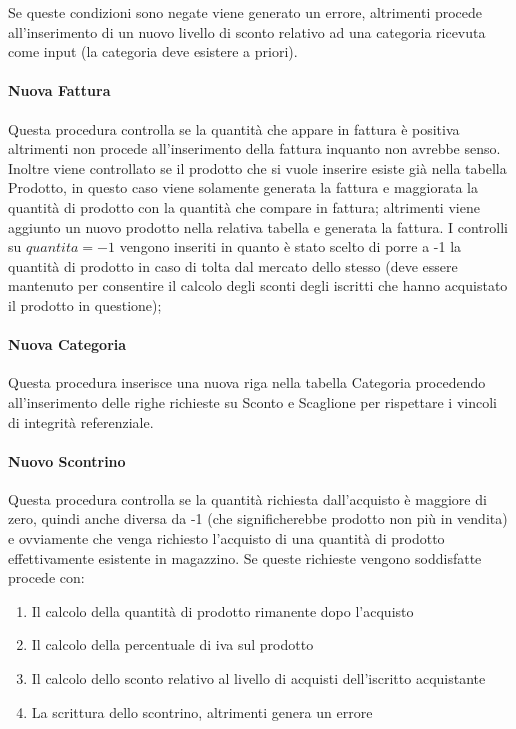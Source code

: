 Se queste condizioni sono negate viene generato un errore, altrimenti procede all'inserimento di un nuovo livello di sconto relativo ad una categoria ricevuta come input (la categoria deve esistere a priori). \newpage



\paragraph*{Nuova Fattura}
Questa procedura controlla se la quantit\`a che appare in fattura \`e positiva altrimenti non procede all'inserimento della fattura inquanto non avrebbe senso. Inoltre viene controllato se il prodotto che si vuole inserire esiste gi\`a nella tabella Prodotto, in questo caso viene solamente generata la fattura e maggiorata la quantit\`a di prodotto con la quantit\`a che compare in fattura; altrimenti viene aggiunto un nuovo prodotto nella relativa tabella e generata la fattura. 
I controlli su $quantita = -1$ vengono inseriti in quanto \`e stato scelto di porre a -1 la quantit\`a di prodotto in caso di tolta dal mercato dello stesso (deve essere mantenuto per consentire il calcolo degli sconti degli iscritti che hanno acquistato il prodotto in questione);



\paragraph*{Nuova Categoria}
Questa procedura inserisce una nuova riga nella tabella Categoria procedendo all'inserimento delle righe richieste su Sconto e Scaglione per rispettare i vincoli di integrit\`a referenziale.



\paragraph*{Nuovo Scontrino}
Questa procedura controlla se la quantit\`a richiesta dall'acquisto \`e maggiore di zero, quindi anche diversa da -1 (che significherebbe prodotto non pi\`u in vendita) e ovviamente che venga richiesto l'acquisto di una quantit\`a di prodotto effettivamente esistente in magazzino. Se queste richieste vengono soddisfatte procede con:
\begin{enumerate}

\item Il calcolo della quantit\`a di prodotto rimanente dopo l'acquisto

\item Il calcolo della percentuale di iva sul prodotto

\item Il calcolo dello sconto relativo al livello di acquisti dell'iscritto acquistante

\item La scrittura dello scontrino, altrimenti genera un errore

\end{enumerate}

